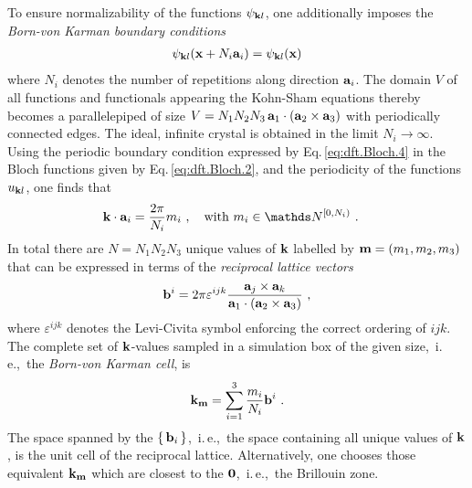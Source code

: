 To ensure normalizability of the functions $\psi_{{\bf k}l}$, one additionally imposes the \emph{Born-von Karman boundary conditions}
\begin{align}
	\psi_{{\bf k}l} ({\bf x} + N_i {\bf a}_i) 
		= \psi_{{\bf k}l} ({\bf x})
	\label{eq:dft.Bloch.4}
\end{align}
where $N_i$ denotes the number of repetitions along direction ${\bf a}_i$. The domain $V$ of all functions and functionals appearing the Kohn-Sham equations thereby becomes a parallelepiped of size 
$V = N_1 N_2 N_3 \, {\bf a}_1 \cdot ({\bf a}_2 \times {\bf a}_3)$ with periodically connected edges. The ideal, infinite crystal is obtained in the limit $N_i \rightarrow \infty$.
Using the periodic boundary condition expressed by Eq.\,\eqref{eq:dft.Bloch.4} in the Bloch functions given by Eq.\,\eqref{eq:dft.Bloch.2}, and the periodicity of the functions $u_{{\bf k} l}$, one finds that
\begin{align}
		{\bf k} \cdot {\bf a}_i
			&= \frac{2 \pi}{N_i} m_i~,\quad\text{with } m_i \in \mathds N^{[0, N_i)}~.
	\label{eq:dft.Bloch.5}
\end{align}
In total there are $N = N_1 N_2 N_3$ unique values of $\bf k$ labelled by ${\bf m} = (m_1, m_2, m_3)$ that can be expressed in terms of the \emph{reciprocal lattice vectors}~\cite{Sands2002}
\begin{align}
	{\bf b}^i 
		= 2 \pi \varepsilon^{ijk} \frac{{\bf a}_j \times {\bf a}_k}{{\bf a}_1 \cdot ({\bf a}_2 \times {\bf a}_3)} ~,
	\label{eq:dft.Bloch.bi}
\end{align}
where $\varepsilon^{ijk}$ denotes the Levi-Civita symbol enforcing the correct ordering of $ijk$. The complete set of $\bf k$-values sampled in a simulation box of the given size,~i.\,e.,~the \emph{Born-von Karman cell}, is
\begin{align}
	{\bf k}_{\bf m} 
		= \sum_{i=1}^3 \frac{m_i}{N_i} {\bf b}^i~.
	\label{eq:dft.Bloch.k_m}
\end{align}
The space spanned by the $\set{{\bf b}_i}$,~i.\,e.,~the space containing all unique values of ${\bf k}$, is the unit cell of the reciprocal lattice. Alternatively, one chooses those equivalent $\bf k_m$ which are closest to the $\bf 0$,~i.\,e.,~the Brillouin zone.

